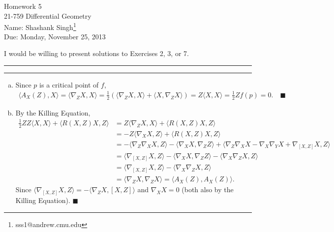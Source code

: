 \documentclass[11pt]{article}
\makeatletter
\newcounter{questionCounter}
\newcounter{partCounter}[questionCounter]
\newenvironment{question}[2][\arabic{questionCounter}]{%
    \setcounter{partCounter}{0}%
    \vspace{.25in} \hrule \vspace{0.5em}%
        \noindent{\bf #2}%
    \vspace{0.8em} \hrule \vspace{.10in}%
    \addtocounter{questionCounter}{1}%
}{}
\newcommand{\myname}{Shashank Singh}
\newcommand{\myandrew}{sss1@andrew.cmu.edu}
\newcommand{\myclass}{21-759 Differential Geometry}
\newcommand{\myhwnum}{5}
\newcommand{\duedate}{Monday, November 25, 2013}
\renewcommand{\qed}{\quad \ensuremath{\blacksquare}}    %
\makeatother
\begin{document}
\thispagestyle{plain}

{\Large Homework \myhwnum} \\
\myclass \\
Name: \myname\footnote{\myandrew} \\
Due: \duedate

I would be willing to present solutions to Exercises 2, 3, or 7.

\begin{question}{Exercise 2}
\begin{enumerate}[a)]
\item Since $p$ is a critical point of $f$,
\begin{align*}
\langle A_X(Z), X \rangle
    = \langle \nabla_Z X, X \rangle
    = \frac{1}{2} \left( \langle \nabla_Z X, X \rangle
    + \langle X, \nabla_Z X \rangle \right)
    = Z \langle X, X \rangle
    = \frac{1}{2} Z f(p)
    = 0. \qed
\end{align*}

\item By the Killing Equation,
\begin{align*}
\frac12 Z Z \langle X, X \rangle + \langle R(X,Z)X, Z \rangle
 &  = Z \langle \nabla_Z X, X \rangle + \langle R(X,Z)X, Z \rangle  \\
 &  = - Z \langle \nabla_X X, Z \rangle + \langle R(X,Z)X, Z \rangle  \\
 &  = - \langle \nabla_Z \nabla_X X, Z \rangle
      - \langle \nabla_X X, \nabla_Z Z \rangle
      + \langle \nabla_Z \nabla_X X - \nabla_X \nabla_Y X + \nabla_{[X,Z]} X,
        Z \rangle  \\
 &  = \langle \nabla_{[X,Z]} X, Z \rangle
    - \langle \nabla_X X, \nabla_Z Z \rangle
    - \langle \nabla_X \nabla_Z X, Z \rangle    \\
 &  = \langle \nabla_{[X,Z]} X, Z \rangle
    - \langle \nabla_X \nabla_Z X, Z \rangle    \\
 &  = \langle \nabla_Z X, \nabla_Z X \rangle
    = \langle A_X(Z), A_X(Z) \rangle.
\end{align*}
Since
$\langle \nabla_{[X,Z]} X, Z \rangle = - \langle \nabla_Z X, [X,Z] \rangle$ and
$\nabla_X X = 0$ (both also by the Killing Equation). \qed
\end{enumerate}
\end{question}
\end{document}
